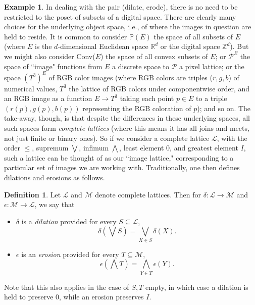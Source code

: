 \documentclass[a4paper]{book}
\theoremstyle{definition}
\newtheorem{example}{Example}[section]
\theoremstyle{definition}
\newtheorem{definition}{Definition}[section]
\theoremstyle{definition}
\theoremstyle{theorem}
\theoremstyle{definition}
\begin{document}
\begin{example}
	In dealing with the pair (dilate, erode), there is no need to be restricted to the poset of subsets of a digital space. There are clearly many choices for the underlying object space, i.e., of where the images in question are held to reside. It is common to consider $\mathbb{P}(E)$ the space of all subsets of $E$ (where $E$ is the $d$-dimensional Euclidean space $\mathbb{R}^d$ or the digital space $\mathbb{Z}^d$). But we might also consider Conv($E$) the space of all convex subsets of $E$; or $\mathcal{P}^E$ the space of ``image" functions from $E$ a discrete space to $\mathcal{P}$ a pixel lattice; or the space $(T^3)^{E}$ of RGB color images (where RGB colors are triples ($r,g,b$) of numerical values, $T^3$ the lattice of RGB colors under componentwise order, and an RGB image as a function $E \rightarrow T^3$ taking each point $p \in E$ to a triple $(r(p), g(p), b(p))$ representing the RGB coloration of $p$); and so on. The take-away, though, is that despite the differences in these underlying spaces, all such spaces form \textit{complete lattices} (where this means it has all joins and meets, not just finite or binary ones). So if we consider a complete lattice $\mathcal{L}$, with the order $\leq$, supremum $\bigvee$, infimum $\bigwedge$, least element $0$, and greatest element $I$, such a lattice can be thought of as our ``image lattice," corresponding to a particular set of images we are working with. Traditionally, one then defines dilations and erosions as follows. 
	\begin{definition}  Let $\mathcal{L}$ and $\mathcal{M}$ denote complete lattices. Then for $\delta: \mathcal{L} \rightarrow \mathcal{M}$ and $\epsilon: \mathcal{M} \rightarrow \mathcal{L}$, we say that 
		\begin{itemize}
			\item $\delta$ is a \textit{dilation}  provided for every $S \subseteq  \mathcal{L}$, 
			\begin{equation}
			\delta(\bigvee S) = \bigvee_{X \in S} \delta(X). 
			\end{equation}
			\item $\epsilon$ is an \textit{erosion}  provided for every $T \subseteq  \mathcal{M}$, 
			\begin{equation}
			\epsilon(\bigwedge T) = \bigwedge_{Y \in T} \epsilon(Y). 
			\end{equation}
		\end{itemize}
		Note that this also applies in the case of $S, T$ empty, in which case a dilation is held to preserve $0$, while an erosion preserves $I$. 

\end{definition}
\end{example}
\end{document}
